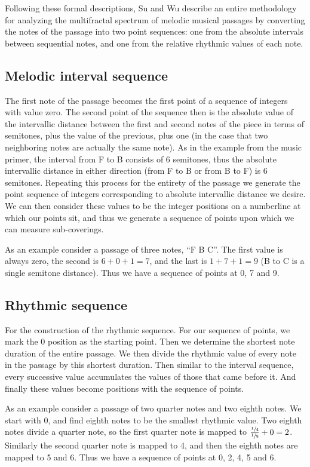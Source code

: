 \documentclass{article}
\begin{document}
Following these formal descriptions, Su and Wu describe an entire methodology
for analyzing the multifractal spectrum of melodic musical passages by
converting the notes of the passage into two point sequences: one from the
absolute intervals between sequential notes, and one from the relative rhythmic
values of each note.

\subsection{Melodic interval sequence}

The first note of the passage becomes the first point of a sequence of integers
with value zero. The second point of the sequence then is the absolute value of
the intervallic distance between the first and second notes of the piece in
terms of semitones, plus the value of the previous, plus one (in the case that
two neighboring notes are actually the same note). As in the example from the
music primer, the interval from F to B consists of 6 semitones, thus the
absolute intervallic distance in either direction (from F to B or from B to F)
is 6 semitones. Repeating this process for the entirety of the passage we
generate the point sequence of integers corresponding to absolute intervallic
distance we desire. We can then consider these values to be the integer
positions on a numberline at which our points sit, and thus we generate a
sequence of points upon which we can measure sub-coverings.

As an example consider a passage of three notes, “F B C”. The first value is
always zero, the second is $6+0+1=7$, and the last is $1+7+1=9$ (B to C is a
single semitone distance). Thus we have a sequence of points at 0, 7 and 9.

\subsection{Rhythmic sequence}

For the construction of the rhythmic sequence. For our sequence of points, we
mark the 0 position as the starting point. Then we determine the shortest note
duration of the entire passage. We then divide the rhythmic value of every note
in the passage by this shortest duration. Then similar to the interval sequence,
every successive value accumulates the values of those that came before it. And
finally these values become positions with the sequence of points.

As an example consider a passage of two quarter notes and two eighth notes. We
start with 0, and find eighth notes to be the smallest rhythmic value. Two
eighth notes divide a quarter note, so the first quarter note is mapped to
$\frac{\sfrac 1 4}{\sfrac 1 8}+0=2$. Similarly the second quarter note is mapped
to 4, and then the eighth notes are mapped to 5 and 6. Thus we have a sequence
of points at 0, 2, 4, 5 and 6.
\end{document}
